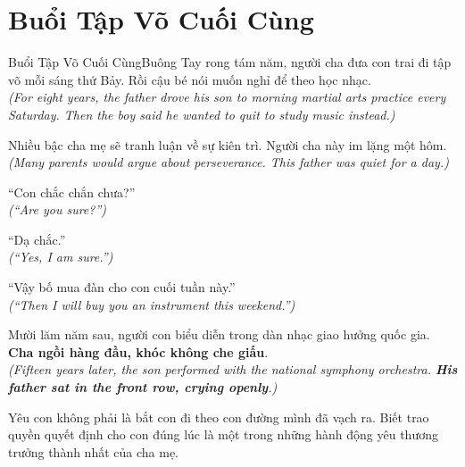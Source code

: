 \section{Buổi Tập Võ Cuối Cùng}
\begin{truyen}{Buổi Tập Võ Cuối Cùng}{Buông Tay}
rong tám năm, người cha đưa con trai đi tập võ mỗi sáng thứ Bảy. Rồi cậu bé nói muốn nghỉ để theo học nhạc.\\
\textit{(For eight years, the father drove his son to morning martial arts practice every Saturday. Then the boy said he wanted to quit to study music instead.)}

Nhiều bậc cha mẹ sẽ tranh luận về sự kiên trì. Người cha này im lặng một hôm.\\
\textit{(Many parents would argue about perseverance. This father was quiet for a day.)}

``Con chắc chắn chưa?''\\
\textit{(``Are you sure?'')}

``Dạ chắc.''\\
\textit{(``Yes, I am sure.'')}

``Vậy bố mua đàn cho con cuối tuần này.''\\
\textit{(``Then I will buy you an instrument this weekend.'')}

Mười lăm năm sau, người con biểu diễn trong dàn nhạc giao hưởng quốc gia. \textbf{Cha ngồi hàng đầu, khóc không che giấu}.\\
\textit{(Fifteen years later, the son performed with the national symphony orchestra. \textbf{His father sat in the front row, crying openly}.)}
\end{truyen}
\begin{baihoc}
  Yêu con không phải là bắt con đi theo con đường mình đã vạch ra. Biết trao quyền quyết định cho con đúng lúc là một trong những hành động yêu thương trưởng thành nhất của cha mẹ.
\end{baihoc}

